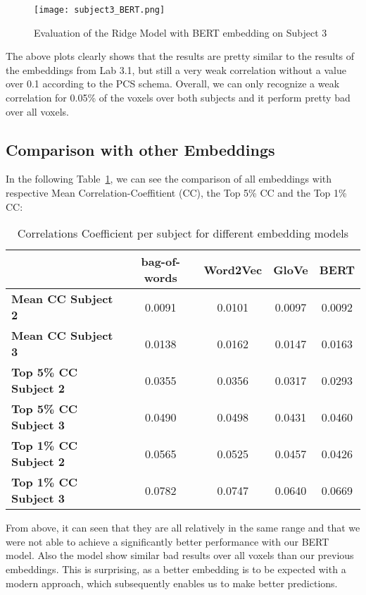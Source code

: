 \documentclass[12pt,letterpaper]{article}
\begin{document}
\begin{figure}[H]
  \centering
  \texttt{[image: subject3\_BERT.png]}
  \caption{Evaluation of the Ridge Model with BERT embedding on Subject 3}
  \label{fig:evaluation_ridge_bert_subject3}
\end{figure}

The above plots clearly shows that the results are pretty similar to the results of the embeddings from Lab 3.1, but still a very weak correlation without a value over 0.1 according to the PCS schema. Overall, we can only recognize a weak correlation for 0.05\% of the voxels over both subjects and it perform pretty bad over all voxels.

\subsection{Comparison with other Embeddings}

In the following Table~\ref{tab:accuracy_values}, we can see the comparison of all embeddings with respective Mean Correlation-Coeffitient (CC), the Top 5\% CC and the Top 1\% CC:

\begin{table}[H]
    \centering
    \begin{tabular}{l c c c c}
        \hline
          & \textbf{bag-of-words} & \textbf{Word2Vec} & \textbf{GloVe}  & \textbf{BERT} \\
        \hline
        \textbf{Mean CC Subject 2} & 0.0091 & 0.0101 & 0.0097 & 0.0092 \\
        \textbf{Mean CC Subject 3} & 0.0138 & 0.0162 & 0.0147 & 0.0163 \\
        \textbf{Top 5\% CC Subject 2} & 0.0355 & 0.0356 & 0.0317 & 0.0293 \\
        \textbf{Top 5\% CC Subject 3} & 0.0490 & 0.0498 & 0.0431 & 0.0460 \\
        \textbf{Top 1\% CC Subject 2} & 0.0565 & 0.0525 & 0.0457 & 0.0426 \\
        \textbf{Top 1\% CC Subject 3} & 0.0782 & 0.0747 & 0.0640 & 0.0669 \\
        \hline
    \end{tabular}
    \caption{Correlations Coefficient per subject for different embedding models}
    \label{tab:accuracy_values}
\end{table}

From above, it can seen that they are all relatively in the same range and that we were not able to achieve a significantly better performance with our BERT model. Also the model show similar bad results over all voxels than our previous embeddings. This is surprising, as a better embedding is to be expected with a modern approach, which subsequently enables us to make better predictions.
\end{document}
